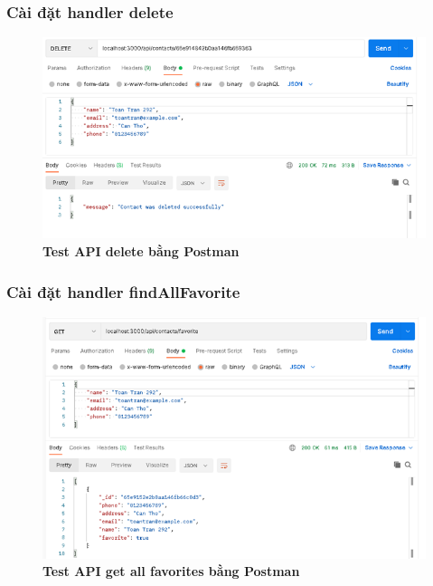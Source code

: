 \subsubsection*{Cài đặt handler delete}
\begin{figure}[H]
  \centering
  \includegraphics[width=15cm]{images/chapterSecond/9.png}
  \caption{\bfseries Test API delete bằng Postman}
\end{figure}
\subsubsection*{Cài đặt handler findAllFavorite}
\begin{figure}[H]
  \centering
  \includegraphics[width=15cm]{images/chapterSecond/10.png}
  \caption{\bfseries Test API get all favorites bằng Postman}
\end{figure}

